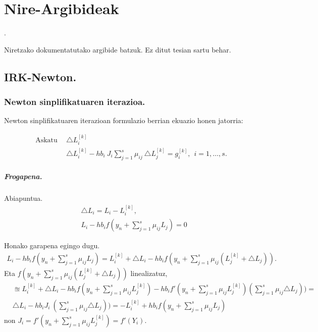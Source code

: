 \chapter{Nire-Argibideak}.

Niretzako dokumentatutako argibide batzuk. Ez ditut tesian sartu behar.

\section{IRK-Newton.}

\subsection*{Newton sinplifikatuaren iterazioa.}
Newton sinplifikatuaren iterazioan formulazio berrian ekuazio honen jatorria:

\begin{align*}
\mbox{Askatu} \ \ & \triangle L_i^{[k]} \\
\ \ &\triangle L_i^{[k]} - h b_i \ J_i \sum_{j=1}^{s} \mu_{ij}  \ \triangle L_j^{[k]} = g_i^{[k]}  , \ \ i=1,\dots,s.
\end{align*}

\paragraph*{Frogapena.}

Abiapuntua.
\begin{align*}
& \triangle L_i=L_i-L_i^{[k]},\\
& L_i-h b_i f(y_n+\sum_{j=1}^{s} \mu_{ij}L_j)=0
\end{align*}

Honako garapena egingo dugu.
\begin{align*}
L_i-h b_i f(y_n+\sum_{j=1}^{s} \mu_{ij}L_j)= L_i^{[k]}+\triangle L_i-h b_i f(y_n+\sum_{j=1}^{s} \mu_{ij} (L_j^{[k]}+\triangle L_j)).
\end{align*}
Eta $f(y_n+\sum_{j=1}^{s} \mu_{ij} (L_j^{[k]}+\triangle L_j))$ linealizatuz,
\begin{align*}
& \approxeq L_i^{[k]}+\triangle L_i-h b_i f(y_n+\sum_{j=1}^{s} \mu_{ij}L_j^{[k]})-h b_i f'(y_n+\sum_{j=1}^{s} \mu_{ij} L_j^{[k]}) (\sum_{j=1}^{s} \mu_{ij} \triangle L_j))= \\
& \triangle L_i- hb_i J_i \ (\sum_{j=1}^{s} \mu_{ij} \triangle L_j))= -L_i^{[k]}+h b_i f(y_n+\sum_{j=1}^{s} \mu_{ij}L_j)
\end{align*}
non $J_i=f'(y_n+\sum_{j=1}^{s} \mu_{ij} L_j^{[k]})=f'(Y_i)$.